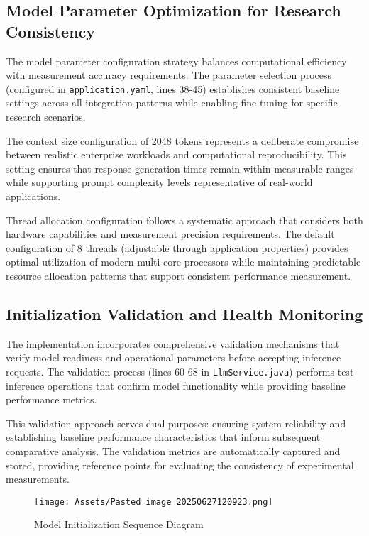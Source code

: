 \subsection{Model Parameter Optimization for Research Consistency}

The model parameter configuration strategy balances computational efficiency with measurement accuracy requirements. The parameter selection process (configured in \texttt{application.yaml}, lines 38-45) establishes consistent baseline settings across all integration patterns while enabling fine-tuning for specific research scenarios.


The context size configuration of 2048 tokens represents a deliberate compromise between realistic enterprise workloads and computational reproducibility. This setting ensures that response generation times remain within measurable ranges while supporting prompt complexity levels representative of real-world applications.

Thread allocation configuration follows a systematic approach that considers both hardware capabilities and measurement precision requirements. The default configuration of 8 threads (adjustable through application properties) provides optimal utilization of modern multi-core processors while maintaining predictable resource allocation patterns that support consistent performance measurement.

\subsection{Initialization Validation and Health Monitoring}

The implementation incorporates comprehensive validation mechanisms that verify model readiness and operational parameters before accepting inference requests. The validation process (lines 60-68 in \texttt{LlmService.java}) performs test inference operations that confirm model functionality while providing baseline performance metrics.


This validation approach serves dual purposes: ensuring system reliability and establishing baseline performance characteristics that inform subsequent comparative analysis. The validation metrics are automatically captured and stored, providing reference points for evaluating the consistency of experimental measurements.

\begin{figure}[H]
    \centering
    \texttt{[image: Assets/Pasted image 20250627120923.png]}
    \caption{Model Initialization Sequence Diagram}
\end{figure}
